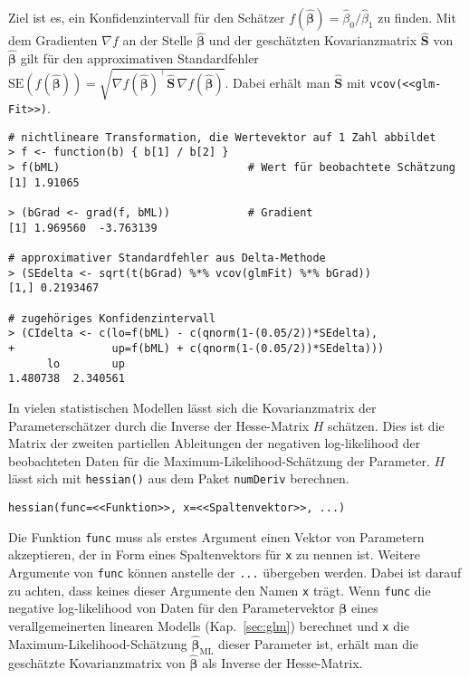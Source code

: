 Ziel ist es, ein Konfidenzintervall für den Schätzer $f(\hat{\bm{\beta}}) = \hat{\beta}_{0} / \hat{\beta}_{1}$ zu finden. Mit dem Gradienten $\nabla f$ an der Stelle $\hat{\bm{\beta}}$ und der geschätzten Kovarianzmatrix $\hat{\bm{S}}$ von $\hat{\bm{\beta}}$ gilt für den approximativen Standardfehler $\text{SE}(f(\hat{\bm{\beta}})) = \sqrt{\nabla f(\hat{\bm{\beta}})^{\top} \hat{\bm{S}}\, \nabla f(\hat{\bm{\beta}})}$. Dabei erhält man $\hat{\bm{S}}$ mit \lstinline!vcov(<<glm-Fit>>)!.
\begin{lstlisting}
# nichtlineare Transformation, die Wertevektor auf 1 Zahl abbildet
> f <- function(b) { b[1] / b[2] }
> f(bML)                             # Wert für beobachtete Schätzung
[1] 1.91065

> (bGrad <- grad(f, bML))            # Gradient
[1] 1.969560  -3.763139

# approximativer Standardfehler aus Delta-Methode
> (SEdelta <- sqrt(t(bGrad) %*% vcov(glmFit) %*% bGrad))
[1,] 0.2193467

# zugehöriges Konfidenzintervall
> (CIdelta <- c(lo=f(bML) - c(qnorm(1-(0.05/2))*SEdelta),
+               up=f(bML) + c(qnorm(1-(0.05/2))*SEdelta)))
      lo        up 
1.480738  2.340561
\end{lstlisting}

In vielen statistischen Modellen lässt sich die Kovarianzmatrix der Parameterschätzer durch die Inverse der Hesse-Matrix $H$ schätzen. Dies ist die Matrix der zweiten partiellen Ableitungen der negativen log-likelihood der beobachteten Daten für die Maximum-Likelihood-Schätzung der Parameter. $H$ lässt sich mit \lstinline!hessian()! aus dem Paket \lstinline!numDeriv! berechnen.
\begin{lstlisting}
hessian(func=<<Funktion>>, x=<<Spaltenvektor>>, ...)
\end{lstlisting}

Die Funktion \lstinline!func! muss als erstes Argument einen Vektor von Parametern akzeptieren, der in Form eines Spaltenvektors für \lstinline!x! zu nennen ist. Weitere Argumente von \lstinline!func! können anstelle der \lstinline!...! übergeben werden. Dabei ist darauf zu achten, dass keines dieser Argumente den Namen \lstinline!x! trägt. Wenn \lstinline!func! die negative log-likelihood von Daten für den Parametervektor $\bm{\beta}$ eines verallgemeinerten linearen Modells (Kap.\ \ref{sec:glm}) berechnet und \lstinline!x! die Maximum-Likelihood-Schätzung $\hat{\bm{\beta}}_{\text{ML}}$ dieser Parameter ist, erhält man die geschätzte Kovarianzmatrix von $\hat{\bm{\beta}}$ als Inverse der Hesse-Matrix.

